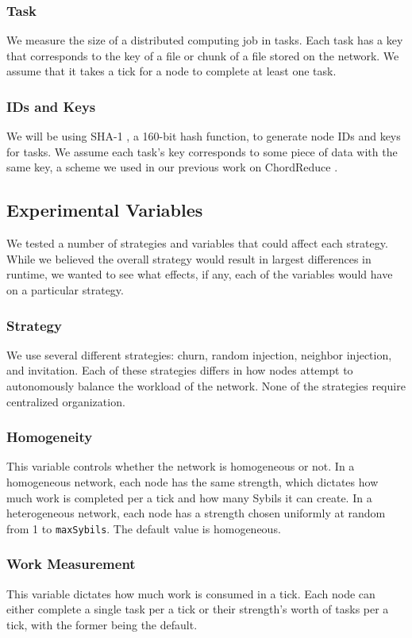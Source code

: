 \documentclass[11pt,conference]{IEEEtran}
\begin{document}
\subsubsection*{Task} We measure the size of a distributed computing job in tasks.
Each task has a key that corresponds to the key of a file or chunk of a file stored on the network.
We assume that it takes a tick for a node to complete at least one task.
\subsubsection*{IDs and Keys} We will be using SHA-1 \cite{sha1}, a 160-bit hash function, to generate node IDs and keys for tasks.  
We assume each task's key corresponds to some piece of data with the same key, a scheme we used in  our previous work on ChordReduce \cite{chordreduce}.
	
\subsection{Experimental Variables}
We tested a number of strategies and variables that could affect each strategy.
While we believed the overall strategy would result in largest differences in runtime, we wanted to see what effects, if any, each of the variables would have on a particular strategy.

\subsubsection*{Strategy} We use several different strategies: churn, random injection, neighbor injection, and invitation.
Each of these strategies differs in how nodes attempt  to autonomously balance the workload of the network.
None of the strategies require centralized organization.
\subsubsection*{Homogeneity}  This variable controls whether the network is homogeneous or not.
In a homogeneous network, each node has the same strength, which dictates how much work is completed per a tick and how many Sybils it can create.
In a heterogeneous network, each node has a strength chosen uniformly at random from 1 to \texttt{maxSybils}.
The default value is homogeneous.
\subsubsection*{Work Measurement} This variable dictates how much work is consumed in a tick.
Each node can either complete a single task per a tick or their strength's worth of tasks per a tick, with the former being the default.
\end{document}
